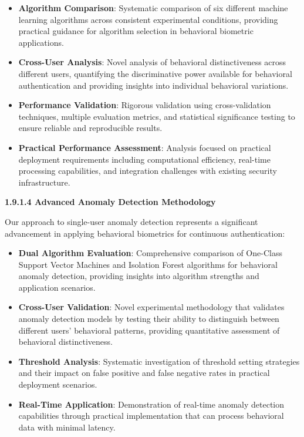 \documentclass[
  12pt,
  a4paper,
]{report}
\begin{document}
\begin{itemize}
\item
  \textbf{Algorithm Comparison}: Systematic comparison of six different
  machine learning algorithms across consistent experimental conditions,
  providing practical guidance for algorithm selection in behavioral
  biometric applications.
\item
  \textbf{Cross-User Analysis}: Novel analysis of behavioral
  distinctiveness across different users, quantifying the discriminative
  power available for behavioral authentication and providing insights
  into individual behavioral variations.
\item
  \textbf{Performance Validation}: Rigorous validation using
  cross-validation techniques, multiple evaluation metrics, and
  statistical significance testing to ensure reliable and reproducible
  results.
\item
  \textbf{Practical Performance Assessment}: Analysis focused on
  practical deployment requirements including computational efficiency,
  real-time processing capabilities, and integration challenges with
  existing security infrastructure.
\end{itemize}

\textbf{1.9.1.4 Advanced Anomaly Detection Methodology}

Our approach to single-user anomaly detection represents a significant
advancement in applying behavioral biometrics for continuous
authentication:

\begin{itemize}
\item
  \textbf{Dual Algorithm Evaluation}: Comprehensive comparison of
  One-Class Support Vector Machines and Isolation Forest algorithms for
  behavioral anomaly detection, providing insights into algorithm
  strengths and application scenarios.
\item
  \textbf{Cross-User Validation}: Novel experimental methodology that
  validates anomaly detection models by testing their ability to
  distinguish between different users' behavioral patterns, providing
  quantitative assessment of behavioral distinctiveness.
\item
  \textbf{Threshold Analysis}: Systematic investigation of threshold
  setting strategies and their impact on false positive and false
  negative rates in practical deployment scenarios.
\item
  \textbf{Real-Time Application}: Demonstration of real-time anomaly
  detection capabilities through practical implementation that can
  process behavioral data with minimal latency.
\end{itemize}
\end{document}
